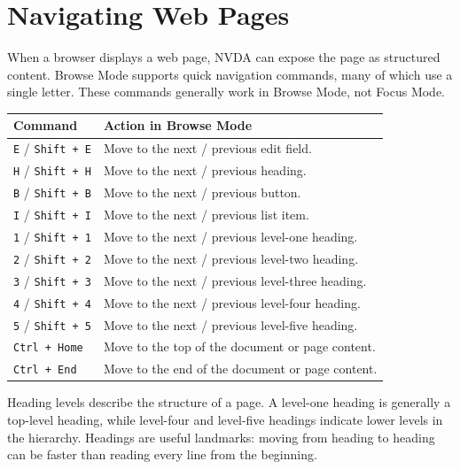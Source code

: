\documentclass[11pt,oneside]{book}
\begin{document}
\chapter{Navigating Web Pages}
When a browser displays a web page, NVDA can expose the page as structured content. Browse Mode supports quick navigation commands, many of which use a single letter. These commands generally work in Browse Mode, not Focus Mode.

\begin{center}
	\begin{tabular}{p{}p{}}
		\toprule
		\textbf{Command}                & \textbf{Action in Browse Mode}                   \\
		\midrule
		\texttt{E} / \texttt{Shift + E} & Move to the next / previous edit field.          \\
		\texttt{H} / \texttt{Shift + H} & Move to the next / previous heading.             \\
		\texttt{B} / \texttt{Shift + B} & Move to the next / previous button.              \\
		\texttt{I} / \texttt{Shift + I} & Move to the next / previous list item.           \\
		\texttt{1} / \texttt{Shift + 1} & Move to the next / previous level-one heading.   \\
		\texttt{2} / \texttt{Shift + 2} & Move to the next / previous level-two heading.   \\
		\texttt{3} / \texttt{Shift + 3} & Move to the next / previous level-three heading. \\
		\texttt{4} / \texttt{Shift + 4} & Move to the next / previous level-four heading.  \\
		\texttt{5} / \texttt{Shift + 5} & Move to the next / previous level-five heading.  \\
		\texttt{Ctrl + Home}            & Move to the top of the document or page content. \\
		\texttt{Ctrl + End}             & Move to the end of the document or page content. \\
		\bottomrule
	\end{tabular}
\end{center}

Heading levels describe the structure of a page. A level-one heading is generally a top-level heading, while level-four and level-five headings indicate lower levels in the hierarchy. Headings are useful landmarks: moving from heading to heading can be faster than reading every line from the beginning.
\end{document}
